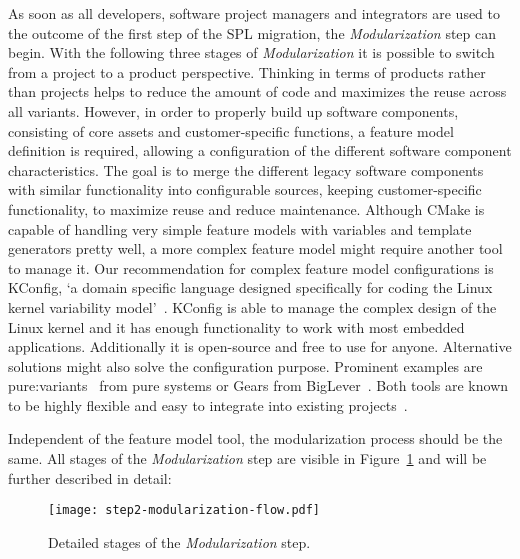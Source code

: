 As soon as all developers, software project managers and integrators are used to
the outcome of the first step of the SPL migration, the \textit{Modularization}
step can begin. With the following three stages of \textit{Modularization} it is
possible to switch from a project to a product perspective. Thinking in terms of
products rather than projects helps to reduce the amount of code and maximizes
the reuse across all variants. However, in order to properly build up software
components, consisting of core assets and customer-specific functions, a feature
model definition is required, allowing a configuration of the different software
component characteristics. The goal is to merge the different legacy software
components with similar functionality into configurable sources, keeping
customer-specific functionality, to maximize reuse and reduce maintenance.
Although CMake is capable of handling very simple feature models with variables
and template generators pretty well, a more complex feature model might require
another tool to manage it. Our recommendation for complex feature model
configurations is KConfig, `a domain specific language designed specifically for
coding the Linux kernel variability model'~\cite[page 3]{kconfigKernel}. KConfig
is able to manage the complex design of the Linux kernel and it has enough
functionality to work with most embedded applications. Additionally it is
open-source and free to use for anyone. Alternative solutions might also solve
the configuration purpose. Prominent examples are
pure:variants~\cite{pureVariantsPureSystems} from pure systems or Gears from
BigLever~\cite{gearsBigLever}. Both tools are known to be highly flexible and
easy to integrate into existing projects~\cite{confsplcGrunerBKR20}.

Independent of the feature model tool, the modularization process should be the same.
All stages of the \textit{Modularization} step are visible in
Figure~\ref{fig:step2Modularization} and will be further described in detail:

\begin{figure}
  \centering
  \texttt{[image: step2-modularization-flow.pdf]}
  \caption{Detailed stages of the \textit{Modularization} step.}
  \label{fig:step2Modularization}
\end{figure}

